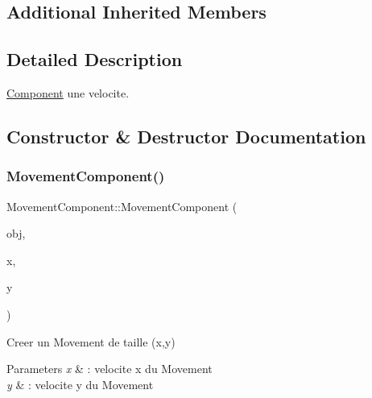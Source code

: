 \subsection*{Additional Inherited Members}


\subsection{Detailed Description}
\hyperlink{class_component}{Component} une velocite. 

\subsection{Constructor \& Destructor Documentation}
\hypertarget{class_movement_component_a16ae8e5bac9a7f101fc18c26ba025e52}{}\label{class_movement_component_a16ae8e5bac9a7f101fc18c26ba025e52} 
\subsubsection{\texorpdfstring{Movement\+Component()}{MovementComponent()}\hspace{0.1cm}{\footnotesize\ttfamily [1/2]}}
{\footnotesize\ttfamily Movement\+Component\+::\+Movement\+Component (\begin{DoxyParamCaption}\item[{\hyperlink{class_game_object}{Game\+Object} $\ast$}]{obj,  }\item[{float}]{x,  }\item[{float}]{y }\end{DoxyParamCaption})\hspace{0.3cm}{\ttfamily [inline]}}



Creer un Movement de taille (x,y) 


\begin{DoxyParams}{Parameters}
{\em x} & \+: velocite x du Movement \\
\hline
{\em y} & \+: velocite y du Movement \\
\hline
\end{DoxyParams}
\hypertarget{class_movement_component_a2cfc3e6dbe3cda60f8dc4d0694494f87}{}\label{class_movement_component_a2cfc3e6dbe3cda60f8dc4d0694494f87} 
